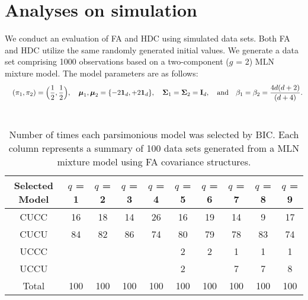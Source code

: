 \documentclass[11pt]{article}
\begin{document}
\section{Analyses on simulation}
We conduct an evaluation of FA and HDC using simulated data sets.
Both FA and HDC utilize the same randomly generated initial values. We generate a data set comprising 1000 observations based on a two-component ($g$ = 2) MLN mixture model. The model parameters are as follows:
$$ \quad (\pi_1,\pi_2) = \Bigl( \frac{1}{2}, \frac{1}{2} \Bigr), \quad {\boldsymbol{\mu}_1,\boldsymbol{\mu}_2} = \{-2\bold{1}_d, +2\bold{1}_d\}, \quad \boldsymbol{\Sigma}_1 = \boldsymbol{\Sigma}_2 = \bold{I}_d, \quad \text{and} \quad \beta_1 = \beta_2 = \frac{4d(d+2)}{(d+4)}. $$
\\
\begin {table}
\caption {Number of times each parsimonious model was selected by BIC. Each column represents a summary of 100 data sets generated from a MLN mixture model using FA covariance structures.} \label{tab:title} 
\def\arraystretch{1.2}
\begin{center}
\begin{tabular}{ |c|c|c|c|c|c|c|c|c|c|} 
\hline
Selected Model& $q$ = 1 & $q$ = 2 & $q$ = 3 & $q$ = 4 & $q$ = 5 & $q$ = 6 & $q$ = 7 & $q$ = 8 & $q$ = 9 \\
\hline
CUCC & 16 & 18 & 14 & 26& 16& 19&14&9&17\\
CUCU & 84 & 82 & 86 & 74& 80& 79&78&83&74\\
UCCC &  &  &  & & 2&2&1&1&1\\
UCCU &  &  &  & & 2&&7&7&8\\
\hline
Total& 100 & 100 & 100 & 100&100&100&100&100&100\\
\hline
\end{tabular}
\end{center}
\end {table}
\\
\end{document}
